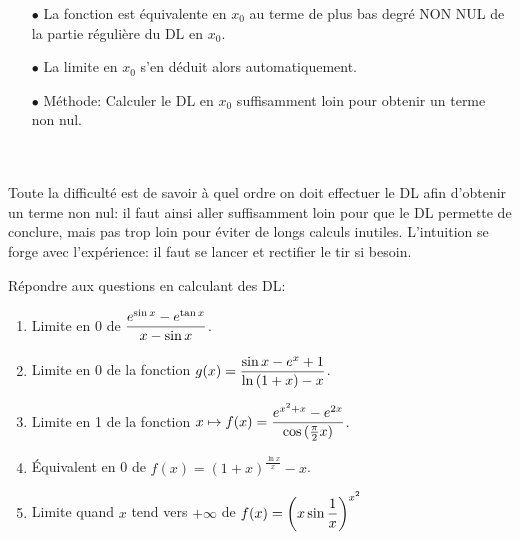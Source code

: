 \documentclass[a4paper, 11pt]{article}
\begin{document}
{\begin{dboxminipage}{0.9 \textwidth}
\begin{itemize}
\item[$\bullet$] La fonction est \'equivalente en $x_0$ au terme de plus bas degr\'e NON NUL de la partie r\'eguli\`ere du DL en $x_0$.
\item[$\bullet$] La limite en $x_0$ s'en d\'eduit alors automatiquement.
\item[$\bullet$] M\'ethode: Calculer le DL en $x_0$ suffisamment loin pour obtenir un terme non nul.
\end{itemize}

\end{dboxminipage}
\\\\

\noindent Toute la difficult\'e est de savoir \`a quel ordre on doit effectuer le DL afin d'obtenir un terme non nul: il faut ainsi aller suffisamment loin pour que le DL permette de conclure, mais pas trop loin pour \'eviter de longs calculs inutiles. L'intuition se forge avec l'exp\'erience: il faut se lancer et rectifier le tir si besoin.


{\footnotesize \begin{exercice} R\'epondre aux questions en calculant des DL:
\begin{enumerate}

\item Limite en 0 de $\displaystyle\frac{e^{\sin{x}} -e^{\tan{x}}  }{x-\sin{x}}$.
\item Limite en 0 de la fonction $g(x)=\displaystyle\frac{\sin{x}-e^x+1}{\ln{(1+x)}-x}$.
\item Limite en 1 de la fonction $x\mapsto f(x)=\displaystyle\frac{e^{x^2+x} -e^{2x}  }{\cos{(\frac{\pi}{2} x)}}$.
 

\item \'Equivalent en 0 de $f(x)=(1+x)^{\frac{\ln{x}}{x}}-x$.
\item Limite quand $x$ tend vers $+\infty$ de $f(x)=\left( x\sin{\displaystyle\frac{1}{x}} \right)^{x^2}$
 
\end{enumerate}
\end{exercice}
}

}
\end{document}
